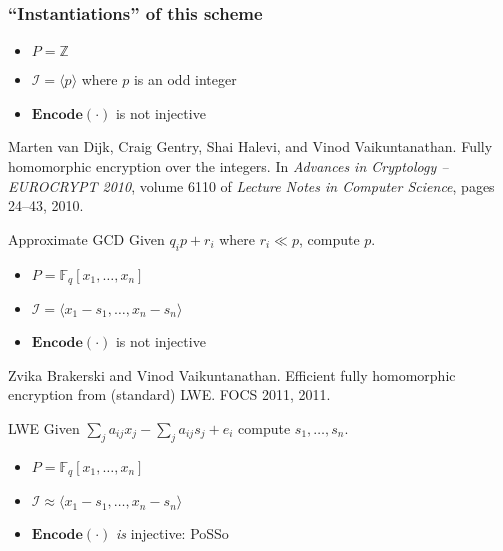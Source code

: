 \documentclass[10pt]{beamer}
\newcommand{\ideal}[1]{\langle {#1} \rangle}
\newcommand{\field}[1]{\mathbb{#1}}
\newcommand{\F}{\field{F}}
\newcommand{\Encode}[1]{\ensuremath{\mathbf{Encode}}(#1)\xspace}
\newcommand{\I}{\ensuremath{\mathcal{I}}\xspace}
\begin{document}
\begin{frame}[allowframebreaks]
\frametitle{``Instantiations'' of this scheme} 

\begin{itemize}
 \item $P = \field{Z}$
 \item $\I = \ideal{p}$ where $p$ is an odd integer
 \item $\Encode{\cdot}$ is not injective
\end{itemize}

\begin{thebibliography}{Gen09}
Marten van Dijk, Craig Gentry, Shai Halevi, and Vinod Vaikuntanathan.
\newblock Fully homomorphic encryption over the integers.
\newblock In {\em Advances in Cryptology -- EUROCRYPT 2010}, volume 6110 of
  {\em Lecture Notes in Computer Science}, pages 24--43, 2010.
\end{thebibliography}

\vspace{0.5cm}

\begin{block}{Approximate GCD}
Given $q_ip + r_i$ where $r_i \ll p$, compute $p$. 
\end{block}


\framebreak

\begin{itemize}
 \item $P = \F_q[x_1,\dots,x_n]$
 \item $\I = \ideal{x_1 - s_1,\dots,x_n - s_n}$
 \item $\Encode{\cdot}$ is not injective
\end{itemize}

\begin{thebibliography}{Gen09}
Zvika Brakerski and Vinod Vaikuntanathan.
\newblock Efficient fully homomorphic encryption from (standard) {LWE}.
\newblock FOCS 2011, 2011.
\end{thebibliography}

\vspace{0.5cm}


\begin{block}{LWE}
Given $\sum_j a_{ij} x_j - \sum_j a_{ij} s_j + e_i$ compute $s_1,\dots,s_n$.
\end{block}


\framebreak

\begin{itemize}
 \item $P = \F_q[x_1,\dots,x_n]$
 \item $\I \approx \ideal{x_1 - s_1,\dots,x_n - s_n}$
 \item $\Encode{\cdot}$ {\it is} injective: PoSSo
\end{itemize}


\end{frame}
\end{document}
